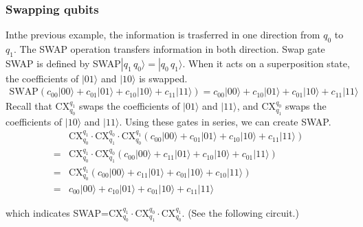 \documentclass[letterpaper,10pt,english]{jupyterBook}
\begin{document}
\subsubsection{Swapping qubits}
\label{\detokenize{q2gates/cx:swapping-qubits}}
\sphinxAtStartPar
Inthe previous example, the information is trasferred in one direction from \(q_0\) to \(q_1\).  The SWAP operation transfers information in both direction.
Swap gate SWAP is defined by SWAP\(|q_1\, q_0\rangle = |q_0\, q_1\rangle\).  When it acts on a superposition state, the coefficients of \(|01\rangle\) and \(|10\rangle\) is swapped.
\begin{equation*}
\begin{split}
\text{SWAP} \left (c_{00} |00\rangle + c_{01} |01\rangle + c_{10} |10\rangle + c_{11} |11\rangle \right ) =
c_{00} |00\rangle + c_{10} |01\rangle + c_{01} |10\rangle + c_{11} |11\rangle
\end{split}
\end{equation*}
\sphinxAtStartPar
Recall that CX\(_{q_0}^{q_1}\) swaps the coefficients of \(|01\rangle\) and \(|11\rangle\), and  CX\(_{q_1}^{q_0}\) swaps the coefficients of \(|10\rangle\) and \(|11\rangle\).  Using these gates in series, we can create SWAP.
\begin{align}
&\text{CX}_{q_0}^{q_1} \cdot \text{CX}_{q_1}^{q_0} \cdot \text{CX}_{q_0}^{q_1} \left(c_{00} |00\rangle + c_{01} |01\rangle + c_{10} |10\rangle + c_{11} |11\rangle \right)\\
= &\text{CX}_{q_0}^{q_1} \cdot \text{CX}_{q_1}^{q_0} \left(c_{00} |00\rangle + c_{11} |01\rangle + c_{10} |10\rangle + c_{01} |11\rangle \right) \\
= &\text{CX}_{q_0}^{q_1}  \left(c_{00} |00\rangle + c_{11} |01\rangle + c_{01} |10\rangle + c_{10} |11\rangle \right)\\
= & c_{00} |00\rangle + c_{10} |01\rangle + c_{01} |10\rangle + c_{11} |11\rangle
\end{align}

\sphinxAtStartPar
which indicates SWAP=\(\text{CX}_{q_0}^{q_1} \cdot  \text{CX}_{q_1}^{q_0} \cdot \text{CX}_{q_0}^{q_1}\). (See the following circuit.)
\end{document}
